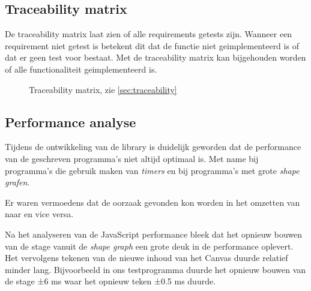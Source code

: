 \subsection{Traceability matrix} \label{sec:traceability}
De traceability matrix laat zien of alle requirements getests zijn. Wanneer een requirement niet getest is betekent dit dat de functie niet geimplementeerd is of dat er geen test voor bestaat. Met de traceability matrix kan bijgehouden worden of alle functionaliteit geimplementeerd is.

\begin{figure}
\begin{center}
\resizebox{\linewidth}{!}{}
\caption{Traceability matrix, zie \autoref{sec:traceability}}
\label{fig:traceability}
\end{center}
\end{figure}

\subsection{Performance analyse}
Tijdens de ontwikkeling van de library is duidelijk geworden dat de performance van de geschreven programma's niet altijd optimaal is. Met name bij programma's die gebruik maken van \emph{timers} en bij programma's met grote \emph{shape grafen}.


Er waren vermoedens dat de oorzaak gevonden kon worden in het omzetten van  naar  en vice versa.

Na het analyseren van de JavaScript performance bleek dat het opnieuw bouwen van de stage vanuit de \emph{shape graph} een grote deuk in de performance oplevert. Het vervolgens tekenen van de nieuwe inhoud van het Canvas duurde relatief minder lang. Bijvoorbeeld in ons testprogramma duurde het opnieuw bouwen van de stage ±6 ms waar het opnieuw teken ±0.5 ms duurde.







